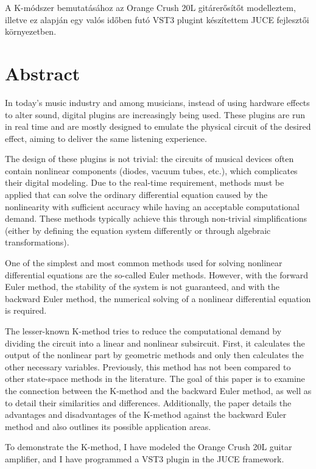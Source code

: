 A K-módszer bemutatásához az Orange Crush 20L gitárerősítőt modelleztem, illetve ez alapján egy valós időben futó VST3 plugint készítettem JUCE fejlesztői környezetben.\vfill


\chapter*{Abstract}
In today's music industry and among musicians, instead of using hardware effects to alter sound, digital plugins are increasingly being used. These plugins are run in real time and are mostly designed to emulate the physical circuit of the desired effect, aiming to deliver the same listening experience.

The design of these plugins is not trivial: the circuits of musical devices often contain nonlinear components (diodes, vacuum tubes, etc.), which complicates their digital modeling. Due to the real-time requirement, methods must be applied that can solve the ordinary differential equation caused by the nonlinearity with sufficient accuracy while having an acceptable computational demand. These methods typically achieve this through non-trivial simplifications (either by defining the equation system differently or through algebraic transformations).

One of the simplest and most common methods used for solving nonlinear differential equations are the so-called Euler methods. However, with the forward Euler method, the stability of the system is not guaranteed, and with the backward Euler method, the numerical solving of a nonlinear differential equation is required.

The lesser-known K-method tries to reduce the computational demand by dividing the circuit into a linear and nonlinear subsircuit. First, it calculates the output of the nonlinear part by geometric methods and only then calculates the other necessary variables. Previously, this method has not been compared to other state-space methods in the literature. The goal of this paper is to examine the connection between the K-method and the backward Euler method, as well as to detail their similarities and differences. Additionally, the paper details the advantages and disadvantages of the K-method against the backward Euler method and also outlines its possible application areas.

To demonstrate the K-method, I have modeled the Orange Crush 20L guitar amplifier, and I have programmed a VST3 plugin in the JUCE framework.
\vfill
\cleardoublepage

\selectthesislanguage

\setcounter{romanPage}{\value{page}}
